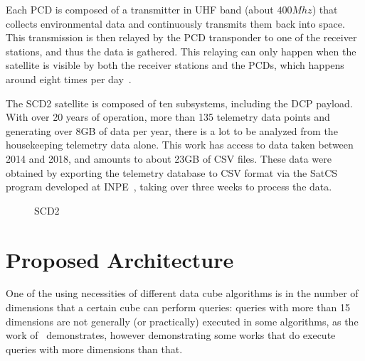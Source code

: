 Each PCD is composed of a transmitter in UHF band (about $400Mhz$) that collects environmental data and continuously transmits them back into space.
This transmission is then relayed by the PCD transponder to one of the receiver stations, and thus the data is gathered.
This relaying can only happen when the satellite is visible by both the receiver stations and the PCDs, which happens around eight times per day~\cite{miguezSCD2OperationHandbook1993}.

The SCD2 satellite is composed of ten subsystems, including the DCP payload.
With over 20 years of operation, more than 135 telemetry data points and generating over 8GB of data per year, there is a lot to be analyzed from the housekeeping telemetry data alone.
This work has access to data taken between 2014 and 2018, and amounts to about 23GB of CSV files.
These data were obtained by exporting the telemetry database to CSV format via the SatCS program developed at INPE~\cite{azevedoFRAMEWORKSISTEMACONTROLE2015}, taking over three weeks to process the data.

\begin{figure}[H]
  \caption{SCD2}\label{fig:scd2_mission}
  \vspace{6mm}
  \begin{center}
  \end{center}
  \vspace{2mm}
\end{figure}

\section{Proposed Architecture}\label{ch:prop:static}

One of the using necessities of different data cube algorithms is in the number of dimensions that a certain cube can perform queries: queries with more than 15 dimensions are not generally (or practically) executed in some algorithms, as the work of~ demonstrates, however demonstrating some works that do execute queries with more dimensions than that.

